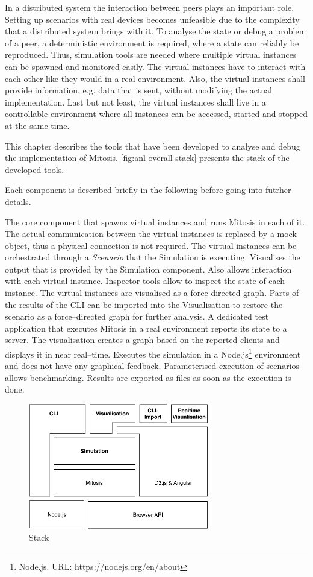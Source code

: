 In a distributed system the interaction between peers plays an important role. Setting up scenarios with real devices becomes unfeasible due to the complexity that a distributed system brings with it. To analyse the state or debug a problem of a peer, a deterministic environment is required, where a state can reliably be reproduced.
Thus, simulation tools are needed where multiple virtual instances can be spawned and monitored easily. The virtual instances have to interact with each other like they would in a real environment. Also, the virtual instances shall provide information, e.g. data that is sent, without modifying the actual implementation. Last but not least, the virtual instances shall live in a controllable environment where all instances can be accessed, started and stopped at the same time. 

This chapter describes the tools that have been developed to analyse and debug the implementation of Mitosis. \vref{fig:anl-overall-stack} presents the stack of the developed tools.

Each component is described briefly in the following before going into futrher details.

\begin{itemize}
     The core component that spawns virtual instances and runs Mitosis in each of it. The actual communication between the virtual instances is replaced by a mock object, thus a physical connection is not required. The virtual instances can be orchestrated through a \textit{Scenario} that the Simulation is executing.
     Visualises the output that is provided by the Simulation component. Also allows interaction with each virtual instance. Inspector tools allow to inspect the state of each instance. The virtual instances are visualised as a force directed graph.
     Parts of the results of the CLI can be imported into the Visualisation to restore the scenario as a force–directed graph for further analysis.
     A dedicated test application that executes Mitosis in a real environment reports its state to a server. The visualisation creates a graph based on the reported clients and displays it in near real–time. 
     Executes the simulation in a Node.js\footnote{\label{nodejs}Node.js. URL: {https://nodejs.org/en/about}} environment and does not have any graphical feedback. Parameterised execution of scenarios allows benchmarking. Results are exported as files as soon as the execution is done.
\end{itemize}

\begin{figure}
\centering
\includegraphics[width=0.7\textwidth]{graphics/analysis-tools/analysis-tools.pdf}
\caption{Stack}
\label{fig:anl-overall-stack}
\end{figure}